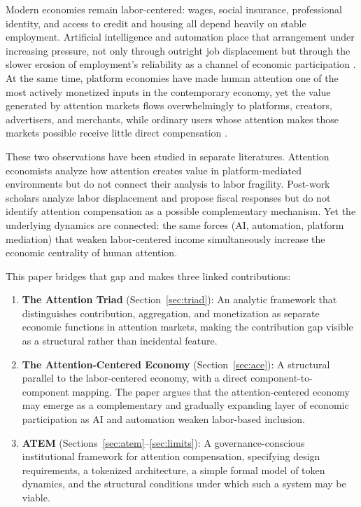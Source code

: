 \documentclass[12pt, a4paper]{article}
\begin{document}
Modern economies remain labor-centered: wages, social insurance, professional identity, and access to credit and housing all depend heavily on stable employment. Artificial intelligence and automation place that arrangement under increasing pressure, not only through outright job displacement but through the slower erosion of employment's reliability as a channel of economic participation \citep{brynjolfsson2014, ford2015}. At the same time, platform economies have made human attention one of the most actively monetized inputs in the contemporary economy, yet the value generated by attention markets flows overwhelmingly to platforms, creators, advertisers, and merchants, while ordinary users whose attention makes those markets possible receive little direct compensation \citep{terranova2012, zuboff2019}.

These two observations have been studied in separate literatures. Attention economists analyze how attention creates value in platform-mediated environments but do not connect their analysis to labor fragility. Post-work scholars analyze labor displacement and propose fiscal responses but do not identify attention compensation as a possible complementary mechanism. Yet the underlying dynamics are connected: the same forces (AI, automation, platform mediation) that weaken labor-centered income simultaneously increase the economic centrality of human attention.

This paper bridges that gap and makes three linked contributions:

\begin{enumerate}
  \item \textbf{The Attention Triad} (Section~\ref{sec:triad}): An analytic framework that distinguishes contribution, aggregation, and monetization as separate economic functions in attention markets, making the contribution gap visible as a structural rather than incidental feature.

  \item \textbf{The Attention-Centered Economy} (Section~\ref{sec:ace}): A structural parallel to the labor-centered economy, with a direct component-to-component mapping. The paper argues that the attention-centered economy may emerge as a complementary and gradually expanding layer of economic participation as AI and automation weaken labor-based inclusion.

  \item \textbf{ATEM} (Sections~\ref{sec:atem}--\ref{sec:limits}): A governance-conscious institutional framework for attention compensation, specifying design requirements, a tokenized architecture, a simple formal model of token dynamics, and the structural conditions under which such a system may be viable.
\end{enumerate}
\end{document}
